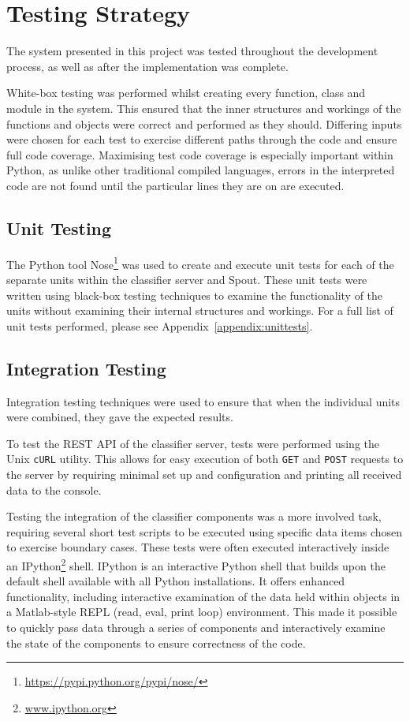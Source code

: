 \documentclass[11pt,a4paper]{report}
\begin{document}
\pagebreak

\chapter{Testing Strategy}
\label{chap:testing}

The system presented in this project was tested throughout the development process, as well as after the implementation was complete.

White-box testing was performed whilst creating every function, class and module in the system. This ensured that the inner structures and workings of the functions and objects were correct and performed as they should. Differing inputs were chosen for each test to exercise different paths through the code and ensure full code coverage. Maximising test code coverage is especially important within Python, as unlike other traditional compiled languages, errors in the interpreted code are not found until the particular lines they are on are executed.

\section{Unit Testing}

The Python tool Nose\footnote{\url{https://pypi.python.org/pypi/nose/}} was used to create and execute unit tests for each of the separate units within the classifier server and Spout. These unit tests were written using black-box testing techniques to examine the functionality of the units without examining their internal structures and workings. For a full list of unit tests performed, please see Appendix~\ref{appendix:unittests}.

\section{Integration Testing}
Integration testing techniques were used to ensure that when the individual units were combined, they gave the expected results.

To test the REST API of the classifier server, tests were performed using the Unix \verb+cURL+ utility. This allows for easy execution of both \texttt{GET} and \texttt{POST} requests to the server by requiring minimal set up and configuration and printing all received data to the console.

Testing the integration of the classifier components was a more involved task, requiring several short test scripts to be executed using specific data items chosen to exercise boundary cases. These tests were often executed interactively inside an IPython\footnote{\url{www.ipython.org}} shell. IPython is an interactive Python shell that builds upon the default shell available with all Python installations. It offers enhanced functionality, including interactive examination of the data held within objects in a Matlab-style REPL (read, eval, print loop) environment. This made it possible to quickly pass data through a series of components and interactively examine the state of the components to ensure correctness of the code.
\end{document}
